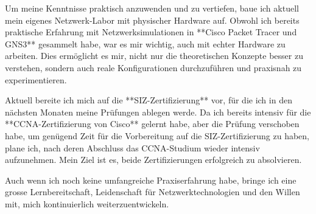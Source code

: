 \documentclass[11pt, a4paper]{awesome-cv}
\begin{document}
\begin{cvletter}
Um meine Kenntnisse praktisch anzuwenden und zu vertiefen, baue ich aktuell mein eigenes Netzwerk-Labor mit physischer Hardware auf. Obwohl ich bereits praktische Erfahrung mit Netzwerksimulationen in **Cisco Packet Tracer und GNS3** gesammelt habe, war es mir wichtig, auch mit echter Hardware zu arbeiten. Dies ermöglicht es mir, nicht nur die theoretischen Konzepte besser zu verstehen, sondern auch reale Konfigurationen durchzuführen und praxisnah zu experimentieren.

Aktuell bereite ich mich auf die **SIZ-Zertifizierung** vor, für die ich in den nächsten Monaten meine Prüfungen ablegen werde. Da ich bereits intensiv für die **CCNA-Zertifizierung von Cisco** gelernt habe, aber die Prüfung verschoben habe, um genügend Zeit für die Vorbereitung auf die SIZ-Zertifizierung zu haben, plane ich, nach deren Abschluss das CCNA-Studium wieder intensiv aufzunehmen. Mein Ziel ist es, beide Zertifizierungen erfolgreich zu absolvieren.


Auch wenn ich noch keine umfangreiche Praxiserfahrung habe, bringe ich eine grosse Lernbereitschaft, Leidenschaft für Netzwerktechnologien und den Willen mit, mich kontinuierlich weiterzuentwickeln. 


\newpage %



\end{cvletter}
\end{document}
